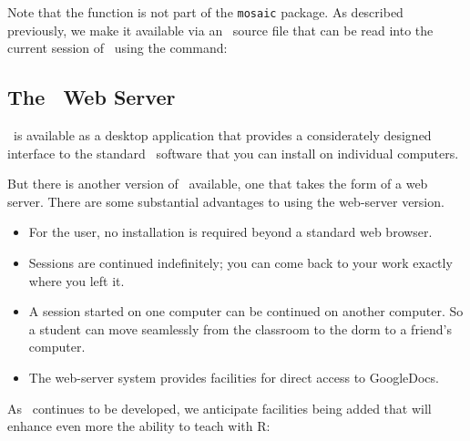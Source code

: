 Note that the  function is not part of the
\texttt{mosaic} package.  As described previously, we make it
available via an \R\ source file that can be read into the current
session of \R\ using the  command:
\begin{knitrout}
\end{knitrout}





\subsection{The \RStudio\ Web Server}

\RStudio\ is available as a desktop application that provides a
considerately designed interface to the standard \R\ software that you
can install on individual computers.

But there is another version of \RStudio\ available, one that takes
the form of a web server.  There are some substantial advantages to
using the web-server version.
\begin{itemize}
\item For the user, no installation is required beyond a standard web browser.
\item Sessions are continued indefinitely; you can come back to your
  work exactly where you left it.
\item A session started on one computer can be continued on another
  computer.  So a student can move seamlessly from the classroom to
  the dorm to a friend's computer.  
\item The web-server system provides facilities for direct access to
  GoogleDocs.
\end{itemize}


As \RStudio\ continues to be developed, we anticipate facilities being
added that will enhance even more the ability to teach with R:



